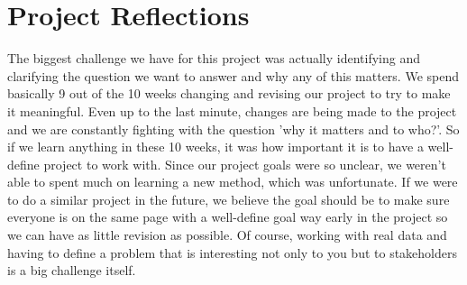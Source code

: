 \documentclass[12pt]{article}
\begin{document}
\section{Project Reflections} \label{sec:Reflections}
The biggest challenge we have for this project was actually identifying and clarifying the question we want to answer and why any of this matters. We spend basically 9 out of the 10 weeks changing and revising our project to try to make it meaningful. Even up to the last minute, changes are being made to the project and we are constantly fighting with the question 'why it matters and to who?'. So if we learn anything in these 10 weeks, it was how important it is to have a well-define project to work with. Since our project goals were so unclear, we weren't able to spent much on learning a new method, which was unfortunate. If we were to do a similar project in the future, we believe the goal should be to make sure everyone is on the same page with a well-define goal way early in the project so we can have as little revision as possible. Of course, working with real data and having to define a problem that is interesting not only to you but to stakeholders is a big challenge itself. 
\end{document}
